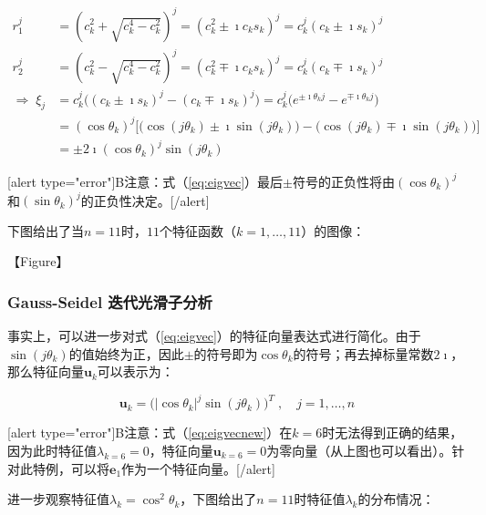 \documentclass[12pt, UTF8, nofonts]{ctexart}
\begin{document}
\begin{equation}
  \label{eq:eigvec}
  \begin{aligned}
    r_1^j &= \left(c_k^2 + \sqrt{c_k^4-c_k^2}\right)^j = \left(c_k^2 \pm \imath c_ks_k\right)^j = c_k^j(c_k \pm \imath s_k)^j \\
    r_2^j &= \left(c_k^2 - \sqrt{c_k^4-c_k^2}\right)^j = \left(c_k^2 \mp \imath c_ks_k\right)^j = c_k^j(c_k \mp \imath s_k)^j \\
    \Rightarrow\; \xi_j &= c_k^j\Big((c_k \pm \imath s_k)^j - (c_k \mp \imath s_k)^j\Big) = c_k^j\Big(e^{\pm\imath\theta_kj} - e^{\mp\imath\theta_kj}\Big) \\
    &= (\cos\theta_k)^j\Bigg[\Big(\cos(j\theta_k)\pm\imath\sin(j\theta_k)\Big) - \Big(\cos(j\theta_k)\mp\imath\sin(j\theta_k)\Big) \Bigg] \\
    &= \pm2\imath(\cos\theta_k)^j\sin(j\theta_k)
  \end{aligned}
\end{equation}

[alert type="error"]B注意：式（\ref{eq:eigvec}）最后$\pm$符号的正负性将由$(\cos\theta_k)^j$和$(\sin\theta_k)^j$的正负性决定。[/alert]

下图给出了当$n=11$时，$11$个特征函数（$k=1,\ldots,11$）的图像：

【Figure】



\subsubsection*{Gauss-Seidel 迭代光滑子分析}

事实上，可以进一步对式（\ref{eq:eigvec}）的特征向量表达式进行简化。由于$\sin(j\theta_k)$的值始终为正，因此$\pm$的符号即为$\cos\theta_k$的符号；再去掉标量常数$2\imath$，那么特征向量$\boldsymbol{u}_k$可以表示为：

\begin{equation}
  \label{eq:eigvecnew}
  \boldsymbol{u}_k = \Big(|\cos\theta_k|^j\sin(j\theta_k)\Big)^T \;,\quad j=1,\ldots,n
\end{equation}

[alert type="error"]B注意：式（\ref{eq:eigvecnew}）在$k=6$时无法得到正确的结果，因为此时特征值$\lambda_{k=6}=0$，特征向量$\boldsymbol{u}_{k=6}=0$为零向量（从上图也可以看出）。针对此特例，可以将$\boldsymbol{e}_1$作为一个特征向量。[/alert]

进一步观察特征值$\lambda_{k}=\cos^2\theta_k$，下图给出了$n=11$时特征值$\lambda_k$的分布情况：
\end{document}
